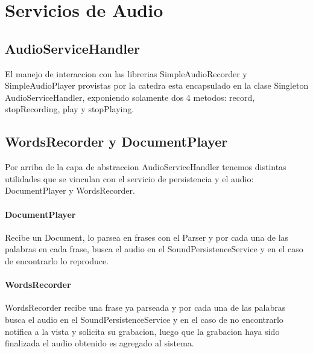 \section{Servicios de Audio}
\subsection{AudioServiceHandler}
El manejo de interaccion con las librerias SimpleAudioRecorder y SimpleAudioPlayer provistas por la catedra esta encapsulado en la clase Singleton AudioServiceHandler, exponiendo solamente dos 4 metodos: record, stopRecording, play y stopPlaying.

\subsection{WordsRecorder y DocumentPlayer}
Por arriba de la capa de abstraccion AudioServiceHandler tenemos distintas utilidades que se vinculan con el servicio de persistencia y el audio: DocumentPlayer y WordsRecorder.

\paragraph{DocumentPlayer}
Recibe un Document, lo parsea en frases con el Parser y por cada una de las palabras en cada frase, busca el audio en el SoundPersistenceService y en el caso de encontrarlo lo reproduce.

\paragraph{WordsRecorder}
WordsRecorder recibe una frase ya parseada y por cada una de las palabras busca el audio en el SoundPersistenceService y en el caso de no encontrarlo notifica a la vista y solicita su grabacion, luego que la grabacion haya sido finalizada el audio obtenido es agregado al sistema.


